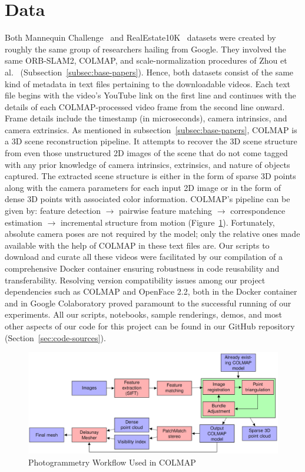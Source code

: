 \section{Data}\label{sec:data} 

Both Mannequin Challenge~\cite{li2019learning} and RealEstate10K~\cite{zhou2018stereo} datasets were created by roughly the same group of researchers hailing from Google. They involved the same ORB-SLAM2, COLMAP, and scale-normalization procedures of Zhou et al.~\cite{zhou2018stereo} (Subsection~\ref{subsec:base-papers}). Hence, both datasets consist of the same kind of metadata in text files pertaining to the downloadable videos. Each text file begins with the video’s YouTube link on the first line and continues with the details of each COLMAP-processed video frame from the second line onward. Frame details include the timestamp (in microseconds), camera intrinsics, and camera extrinsics. As mentioned in subsection~\ref{subsec:base-papers}, COLMAP is a 3D scene reconstruction pipeline. It attempts to recover the 3D scene structure from even those unstructured 2D images of the scene that do not come tagged with any prior knowledge of camera intrinsics, extrinsics, and nature of objects captured. The extracted scene structure is either in the form of sparse 3D points along with the camera parameters for each input 2D image or in the form of dense 3D points with associated color information. COLMAP's pipeline can be given by: feature detection $\rightarrow$ pairwise feature matching  $\rightarrow$ correspondence estimation $\rightarrow$ incremental structure from motion (Figure~\ref{fig:colmap-photogrammetry-pipeline}). Fortunately, absolute camera poses are not required by the model; only the relative ones made available with the help of COLMAP in these text files are. Our scripts to download and curate all these videos were facilitated by our compilation of a comprehensive Docker container ensuring robustness in code reusability and transferability. Resolving version compatibility issues among our project dependencies such as COLMAP and OpenFace 2.2, both in the Docker container and in Google Colaboratory proved paramount to the successful running of our experiments. All our scripts, notebooks, sample renderings, demos, and most other aspects of our code for this project can be found in our GitHub repository (Section~\ref{sec:code-sources}).

\begin{figure}[!h]
    \includegraphics[width=1\columnwidth]{figures/colmap-photogrammetry-pipeline.png}
    \caption{Photogrammetry Workflow Used in COLMAP~\cite{pinard_does_2021}}
    \label{fig:colmap-photogrammetry-pipeline}
\end{figure}
    
